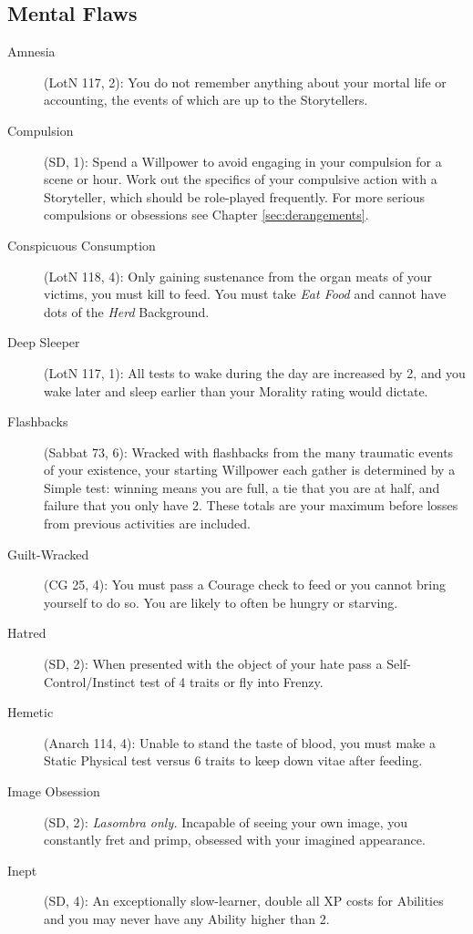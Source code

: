 \subsection{Mental Flaws}
\begin{description}
	\item[Amnesia] (LotN 117, 2):  You do not remember anything about your mortal life or 
	accounting, the events of which are up to the Storytellers.
	\item[Compulsion] (SD, 1):  Spend a Willpower to avoid engaging in your compulsion for 
	a scene or hour.  Work out the specifics of your compulsive action with a Storyteller, 
	which should be role-played frequently.  For more serious compulsions or obsessions see 
	Chapter \ref{sec:derangements}.
	\item[Conspicuous Consumption] (LotN 118, 4):  Only gaining sustenance from the organ 
	meats of your victims, you must kill to feed.  You must take \emph{Eat Food} and cannot 
	have dots of the \emph{Herd} Background.
	\item[Deep Sleeper] (LotN 117, 1):  All tests to wake during the day are increased by 
	2, and you wake later and sleep earlier than your Morality rating would dictate.
	\item[Flashbacks] (Sabbat 73, 6):  Wracked with flashbacks from the many traumatic events 
	of your existence, your starting Willpower each gather is determined by a Simple test:  
	winning means you are full, a tie that you are at half, and failure that you only have 2.  
	These totals are your maximum before losses from previous activities are included.
	\item[Guilt-Wracked] (CG 25, 4):  You must pass a Courage check to feed or you cannot 
	bring yourself to do so.  You are likely to often be hungry or starving.
	\item[Hatred] (SD, 2):  When presented with the object of your hate pass a 
	Self-Control/Instinct test of 4 traits or fly into Frenzy.
	\item[Hemetic] (Anarch 114, 4):  Unable to stand the taste of blood, you must make a 
	Static Physical test versus 6 traits to keep down vitae after feeding.
	\item[Image Obsession] (SD, 2):  \emph{Lasombra only.}  Incapable of seeing your 
	own image, you constantly fret and primp, obsessed with your imagined appearance.
	\item[Inept] (SD, 4):  An exceptionally slow-learner, double all XP costs for 
	Abilities and you may never have any Ability higher than 2.

\end{description}
